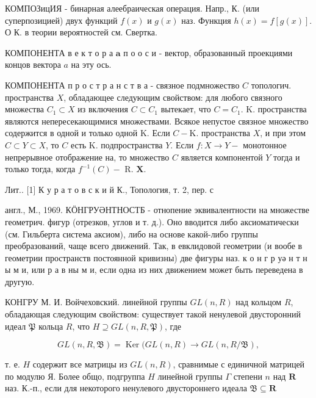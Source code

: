 \documentclass[10pt]{article}
\begin{document}
КОМПОЗицИЯ - бинарная алеебраическая операция. Напр., К. (или суперпозицией) двух функций $f(x)$ и $g(x)$ наз. Функция $h(x)=f[g(x)]$. О К. в теории вероятностей см. Свертка.



КОМПОНЕНТА в е к т о р а $\boldsymbol{a}$ п о о с и - вектор, образованный проекциями концов вектора $a$ на эту ось.



КОМПОНЕНТА п р о с т р а н с т в а - связное подмножество $C$ топологич. пространства $X$, обладающее следующим свойством: для любого связного множества $C_{1} \subset X$ из включения $C \subset C_{1}$ вытекает, что $C=C_{1}$. K. пространства являются непересекающимися множествами. Всякое непустое связное множество содержится в одной и только одной $\mathrm{K}$. Если $C-\mathrm{K}$. пространства $X$, и при этом $C \subset Y \subset X$, то $C$ есть $\mathrm{K}$. подпространства $Y$. Если $f: X \rightarrow Y-$ монотонное непрерывное отображение на, то множество $C$ является компонентой $Y$ тогда и только тогда, когда $f^{-1}(C)-$ R. $\boldsymbol{X}$.



Лит.. [1] К у р а т о в с к и й К., Топология, т. 2, пер. с

англ., М., 1969. КӦНГРУӘНТНОСТБ - отнопение эквивалентности на множестве геометрич. фигур (отрезков, углов и т. д.). Оно вводится либо аксиоматически (см. Гильберта система аксиом), либо на основе какой-либо группы преобразований, чаще всего движений. Так, в евклидовой геометрии (и вообе в геометрии пространств постоянной кривизны) две фигуры наз. к о н г р уә н т н ы м и, или р а в ны м и, если одна из них движением может быть переведена в другую.



КОНГРУ $М$. И. Войчеховский. линейной группы $G L(n, R)$ над кольцом $R$, обладающая следующим свойством: существует такой ненулевой двусторонний идеал $\mathfrak{P}$ кольца $R$, что $H \supseteq G L(n, R, \mathfrak{P})$, где



\[

G L(n, R, \mathfrak{B})=\operatorname{Ker}(G L(n, R) \longrightarrow G L(n, R / \mathfrak{B}),

\]



т. е. $H$ содержит все матрицы из $G L(n, R)$, сравнимые с единичной матрицей по модулю Я. Более общо, подгруппа $H$ линейной группы $\Gamma$ степени $n$ над $\boldsymbol{R}$ наз. К.-п., если для некоторого ненулевого двустороннего идеала $\mathfrak{B} \subseteq \boldsymbol{R}$
\end{document}
